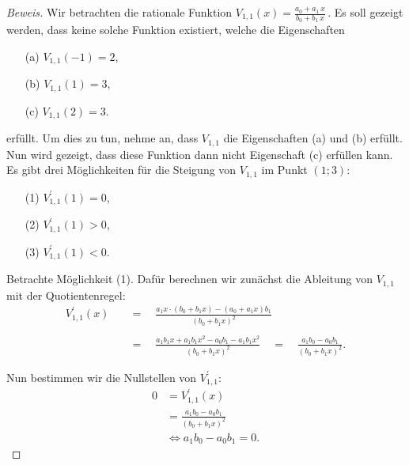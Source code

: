 \documentclass[10pt]{article}
\begin{document}
\begin{proof}[Beweis]

    Wir betrachten die rationale Funktion $V_{1,1}(x) = \frac{a_0 + a_1\,x}{b_0 + b_1\,x}$\,. Es soll gezeigt werden,
    dass keine solche Funktion existiert, welche die Eigenschaften
    \begin{itemize}
        \item[(a)] $V_{1,1}(-1) =  2$,
        \item[(b)] $V_{1,1}(1) =  3$,
        \item[(c)] $V_{1,1}(2) =  3$.
    \end{itemize}

    erfüllt. Um dies zu tun, nehme an, dass $V_{1,1}$ die Eigenschaften (a) und (b) erfüllt. Nun wird gezeigt, dass diese Funktion dann
    nicht Eigenschaft (c) erfüllen kann. Es gibt drei Möglichkeiten für die Steigung von $V_{1,1}$ im Punkt $(1;3)$:
    \begin{itemize}
        \item[(1)] $V_{1,1}^\prime(1) = 0$,
        \item[(2)] $V_{1,1}^\prime(1) > 0$,
        \item[(3)] $V_{1,1}^\prime(1) < 0$.
    \end{itemize}

    Betrachte Möglichkeit (1). Dafür berechnen wir zunächst die Ableitung von $V_{1,1}$ mit der Quotientenregel:
    \begin{align*}
        V_{1,1}^\prime(x) \quad&=\quad \frac{a_1x\cdot (b_0 + b_1x) - (a_0 + a_1x)b_1}{(b_0 + b_1x)^2} \\\\
                          \quad&=\quad \frac{a_1b_1x + a_1b_1x^2 - a_0b_1 - a_1b_1x^2}{(b_0 + b_1x)^2} 
                          \quad=\quad \frac{a_1b_0 - a_0b_1}{(b_0 + b_1x)^2}.
    \end{align*}

    Nun bestimmen wir die Nullstellen von $V_{1,1}^\prime$:
    \begin{align*}
        0 &= V_{1,1}^\prime(x)                      \\
          &= \frac{a_1b_0 - a_0b_1}{(b_0 + b_1x)^2} \\
          &\Leftrightarrow a_1b_0 - a_0b_1 = 0.
    \end{align*}


\end{proof}
\end{document}
